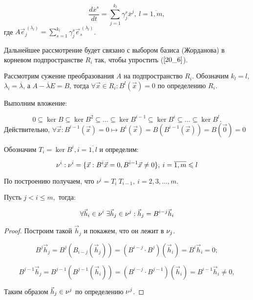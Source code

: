 \begin{equation}\label{20_6}
	\frac{d\overline{x}^s}{dt} = \sum\limits_{j = 1}^{k_l}\gamma_j^s \overline{x}^j, \: l = \overline{1, m},
\end{equation}
где $A \vec{e}^{\: (\lambda_l)}_j = \sum\limits_{s=1}^{k_l}\gamma_j^s \vec{e}^{\: (\lambda_l)}_s$.

Дальнейшее рассмотрение будет связано с выбором базиса (Жорданова) в корневом подпространстве $R_i$ так, чтобы  упростить ($\ref{20_6}$).

Рассмотрим сужение преобразования $A$ на подпространство $R_i$. Обозначим $k_l = l$, $\lambda_i = \overline{\lambda}$, а $A - \overline{\lambda} E = B$, тогда $\forall \vec{x}\in R_i: B^l (\vec{x}) = 0$ по определению $R_i$.

Выполним вложение:

\[0\subseteq \ker B \subseteq \ker B^2 \subseteq ... \subseteq \ker B^{i - 1} \subseteq \ker B^i \subseteq ... \subseteq \ker B^l.\]
Действительно, $\forall \vec{x}: B^{i-1}(\vec{x}) = 0 \mapsto B^i(\vec{x}) = B(B^{i-1}(\vec{x})) = B(\vec{0}) = 0$

Обозначим $T_i = \ker B^i, i = \overline{1,l}$ и определим:

\[\nu^i: \nu^i= \{\vec{x}: B^i \vec{x} = 0, B^{i-1}\vec{x} \neq 0 \}, \: i = \overline{1,m} \leqslant l\]

По построению получаем, что $\nu^i = T_i \ T_{i-1}, \: i = 2,3,...,m.$

\begin{theorem}\label{theor-20_1}
	Пусть $j < i \leqslant m,$ тогда:
	
	\begin{equation}\label{20_7}
		\forall \vec{h}_i \in \nu^i \; \exists \vec{h}_j \in  \nu^j: \vec{h}_j = B^{i - j} \vec{h}_i
	\end{equation}
	\begin{proof}
		
		Построим такой $\vec{h}_j$ и покажем, что он лежит в $\nu_j$.
		
		\[B^j\vec{h}_j = B^j (B_{i-j} (\vec{h}_j)) = (B^{i - j} \cdot B^j)(\vec{h}_i) = B^i \vec{h}_i = 0; \]
		
		\[B^{j- 1} \vec{h}_j = B^{j - 1}(B^{j - 1} (\vec{h}_i)) = (B^{i - j} \cdot B^{j-1})(\vec{h}_i) = B^{i-1} \vec{h}_i \neq 0,\]
		
		Таким образом $\vec{h}_j \in \nu^j$ по определению $\nu^j$.
	\end{proof}
\end{theorem}

